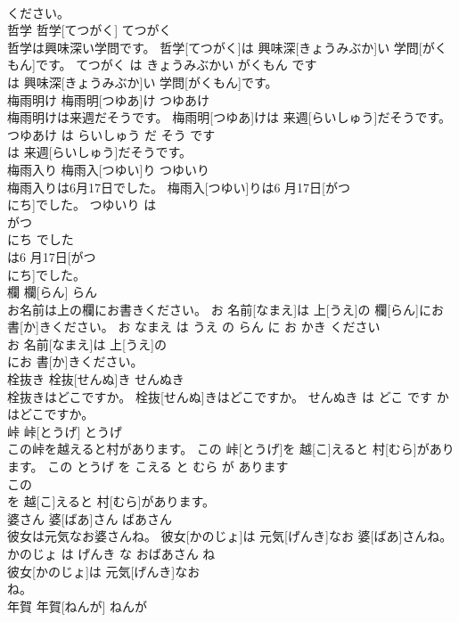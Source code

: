 \documentclass[8pt]{extreport}
\begin{document}
\begin{CJK}{UTF8}{min}
\\	ください。			
\\	哲学	哲学[てつがく]	てつがく	
\\	哲学は興味深い学問です。	哲学[てつがく]は 興味深[きょうみぶか]い 学問[がくもん]です。	てつがく は きょうみぶかい がくもん です	
\\	は 興味深[きょうみぶか]い 学問[がくもん]です。			
\\	梅雨明け	梅雨明[つゆあ]け	つゆあけ	
\\	梅雨明けは来週だそうです。	梅雨明[つゆあ]けは 来週[らいしゅう]だそうです。	つゆあけ は らいしゅう だ そう です	
\\	は 来週[らいしゅう]だそうです。			
\\	梅雨入り	梅雨入[つゆい]り	つゆいり	
\\	梅雨入りは6月17日でした。	梅雨入[つゆい]りは6 月17日[がつ 
\\	にち]でした。	つゆいり は 
\\	がつ 
\\	にち でした	
\\	は6 月17日[がつ 
\\	にち]でした。			
\\	欄	欄[らん]	らん	
\\	お名前は上の欄にお書きください。	お 名前[なまえ]は 上[うえ]の 欄[らん]にお 書[か]きください。	お なまえ は うえ の らん に お かき ください	
\\	お 名前[なまえ]は 上[うえ]の
\\	にお 書[か]きください。			
\\	栓抜き	栓抜[せんぬ]き	せんぬき	
\\	栓抜きはどこですか。	栓抜[せんぬ]きはどこですか。	せんぬき は どこ です か	
\\	はどこですか。			
\\	峠	峠[とうげ]	とうげ	
\\	この峠を越えると村があります。	この 峠[とうげ]を 越[こ]えると 村[むら]があります。	この とうげ を こえる と むら が あります	
\\	この
\\	を 越[こ]えると 村[むら]があります。			
\\	婆さん	婆[ばあ]さん	ばあさん	
\\	彼女は元気なお婆さんね。	彼女[かのじょ]は 元気[げんき]なお 婆[ばあ]さんね。	かのじょ は げんき な おばあさん ね	
\\	彼女[かのじょ]は 元気[げんき]なお
\\	ね。			
\\	年賀	年賀[ねんが]	ねんが	

\end{CJK}
\end{document}
